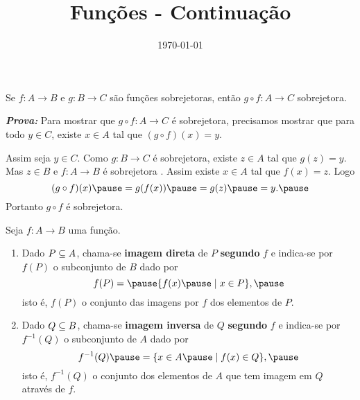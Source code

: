 \documentclass{beamer}
\title{Fun\c{c}\~oes - Continuação}
\author[\autor]{\autor}
\institute[\instituto]{\instituto}
\date{\today}
\begin{document}
    \begin{frame}
        \maketitle
    \end{frame}


    \begin{frame}
        \begin{proposicao}
            Se $f : A \to B$ \pause e $g : B \to C$ \pause s{\~a}o fun\c{c}\~oes sobrejetoras, \pause ent{\~a}o $g\circ f : A \to C$  sobrejetora.\pause
        \end{proposicao}
        \noindent \textbf{\textit{Prova: }}\pause
        Para mostrar que $g \circ f : A \to C$ \pause \'e sobrejetora, \pause precisamos mostrar que para todo $y \in C$, \pause existe $x \in A$ \pause tal que $(g\circ f)(x) = y$.\pause

        Assim seja $y \in C$. \pause Como $g : B \to C$ \'e sobrejetora, \pause existe $z \in A$ \pause tal que $g(z) = y$. \pause Mas $z \in B$ \pause e $f : A \to B$ \pause \'e sobrejetora \pause. Assim existe $x \in A$ \pause tal que $f(x) = z$. \pause Logo\pause
        \[
            (g\circ f)(x) \pause = g(f(x)) \pause = g(z) \pause = y.\pause
        \]
        Portanto $g \circ f$ \pause \'e sobrejetora.\pause \hspace{.5cm} \qedsymbol
    \end{frame}

    \begin{frame}
        \begin{definicao}
            Seja $f : A \to B$ \pause uma fun{\c c}{\~a}o.\pause
            \begin{enumerate}[label={\roman*})]
                \item Dado $P \subseteq A$, \pause chama-se \textbf{imagem direta} \pause de $P$ \pause \textbf{segundo} $f$ \pause e indica-se por $f(P)$ \pause o subconjunto de $B$ \pause dado por\pause
                \[
                    f(P) = \pause \{f(x) \pause \mid x \in P\},\pause
                \]
                isto {\'e}, \pause $f(P)$  o conjunto das imagens por $f$ \pause dos elementos de $P$.\pause
                
                \vspace{.5cm}

                \item Dado $Q \subseteq B$, \pause chama-se \textbf{imagem inversa} \pause de $Q$ \textbf{segundo} $f$ \pause e indica-se por \pause $f^{-1}(Q)$ \pause o subconjunto de $A$ \pause dado por\pause
                \[
                    f^{-1}(Q) \pause = \{x \in A \pause \mid f(x) \in Q\},\pause
                \]
                isto {\'e}, \pause $f^{-1}(Q)$  o conjunto dos elementos de $A$ \pause que tem imagem em $Q$ \pause atrav{\'e}s de $f$.\pause
            \end{enumerate}
        \end{definicao}
    \end{frame}
\end{document}
